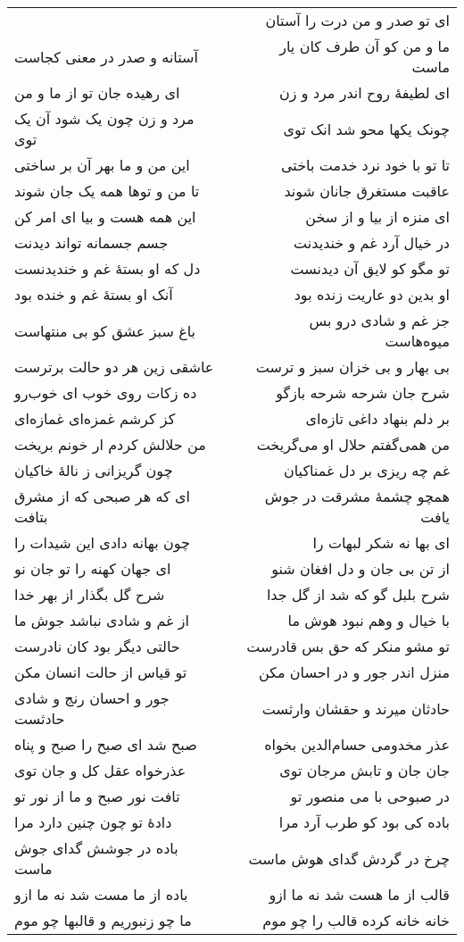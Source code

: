 \begin{center}
\begin{longtable}{l p{0.5cm} r}
&&
ای تو صدر و من درت را آستان
\\
آستانه و صدر در معنی کجاست
&&
ما و من کو آن طرف کان یار ماست
\\
ای رهیده جان تو از ما و من
&&
ای لطیفهٔ روح اندر مرد و زن
\\
مرد و زن چون یک شود آن یک توی
&&
چونک یکها محو شد انک توی
\\
این من و ما بهر آن بر ساختی
&&
تا تو با خود نرد خدمت باختی
\\
تا من و توها همه یک جان شوند
&&
عاقبت مستغرق جانان شوند
\\
این همه هست و بیا ای امر کن
&&
ای منزه از بیا و از سخن
\\
جسم جسمانه تواند دیدنت
&&
در خیال آرد غم و خندیدنت
\\
دل که او بستهٔ غم و خندیدنست
&&
تو مگو کو لایق آن دیدنست
\\
آنک او بستهٔ غم و خنده بود
&&
او بدین دو عاریت زنده بود
\\
باغ سبز عشق کو بی منتهاست
&&
جز غم و شادی درو بس میوه‌هاست
\\
عاشقی زین هر دو حالت برترست
&&
بی بهار و بی خزان سبز و ترست
\\
ده زکات روی خوب ای خوب‌رو
&&
شرح جان شرحه شرحه بازگو
\\
کز کرشم غمزه‌ای غمازه‌ای
&&
بر دلم بنهاد داغی تازه‌ای
\\
من حلالش کردم ار خونم بریخت
&&
من همی‌گفتم حلال او می‌گریخت
\\
چون گریزانی ز نالهٔ خاکیان
&&
غم چه ریزی بر دل غمناکیان
\\
ای که هر صبحی که از مشرق بتافت
&&
همچو چشمهٔ مشرقت در جوش یافت
\\
چون بهانه دادی این شیدات را
&&
ای بها نه شکر لبهات را
\\
ای جهان کهنه را تو جان نو
&&
از تن بی جان و دل افغان شنو
\\
شرح گل بگذار از بهر خدا
&&
شرح بلبل گو که شد از گل جدا
\\
از غم و شادی نباشد جوش ما
&&
با خیال و وهم نبود هوش ما
\\
حالتی دیگر بود کان نادرست
&&
تو مشو منکر که حق بس قادرست
\\
تو قیاس از حالت انسان مکن
&&
منزل اندر جور و در احسان مکن
\\
جور و احسان رنج و شادی حادثست
&&
حادثان میرند و حقشان وارثست
\\
صبح شد ای صبح را صبح و پناه
&&
عذر مخدومی حسام‌الدین بخواه
\\
عذرخواه عقل کل و جان توی
&&
جان جان و تابش مرجان توی
\\
تافت نور صبح و ما از نور تو
&&
در صبوحی با می منصور تو
\\
دادهٔ تو چون چنین دارد مرا
&&
باده کی بود کو طرب آرد مرا
\\
باده در جوشش گدای جوش ماست
&&
چرخ در گردش گدای هوش ماست
\\
باده از ما مست شد نه ما ازو
&&
قالب از ما هست شد نه ما ازو
\\
ما چو زنبوریم و قالبها چو موم
&&
خانه خانه کرده قالب را چو موم
\\
\end{longtable}
\end{center}
